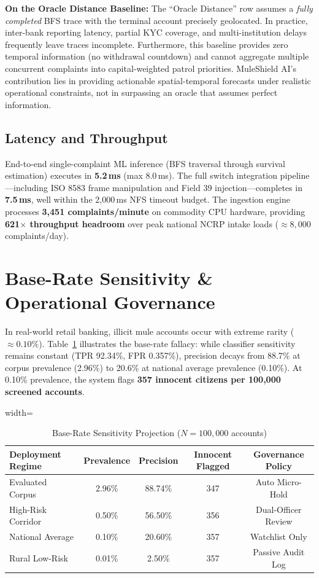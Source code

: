 \documentclass[conference]{IEEEtran}
\begin{document}
\textbf{On the Oracle Distance Baseline:} The ``Oracle Distance'' row assumes a \textit{fully completed} BFS trace with the terminal account precisely geolocated. In practice, inter-bank reporting latency, partial KYC coverage, and multi-institution delays frequently leave traces incomplete. Furthermore, this baseline provides zero temporal information (no withdrawal countdown) and cannot aggregate multiple concurrent complaints into capital-weighted patrol priorities. MuleShield AI's contribution lies in providing actionable spatial-temporal forecasts under realistic operational constraints, not in surpassing an oracle that assumes perfect information.

\subsection{Latency and Throughput}
End-to-end single-complaint ML inference (BFS traversal through survival estimation) executes in \textbf{5.2\,ms} (max 8.0\,ms). The full switch integration pipeline---including ISO 8583 frame manipulation and Field 39 injection---completes in \textbf{7.5\,ms}, well within the 2,000\,ms NFS timeout budget. The ingestion engine processes \textbf{3,451 complaints/minute} on commodity CPU hardware, providing \textbf{621$\times$ throughput headroom} over peak national NCRP intake loads ($\approx 8,000$ complaints/day).

\section{Base-Rate Sensitivity \& Operational Governance}
In real-world retail banking, illicit mule accounts occur with extreme rarity ($\approx 0.10\%$). Table~\ref{tab:baserate} illustrates the base-rate fallacy: while classifier sensitivity remains constant (TPR 92.34\%, FPR 0.357\%), precision decays from 88.7\% at corpus prevalence (2.96\%) to 20.6\% at national average prevalence (0.10\%). At 0.10\% prevalence, the system flags \textbf{357 innocent citizens per 100,000 screened accounts}.

\begin{table}[htbp]
\caption{Base-Rate Sensitivity Projection ($N=100,000$ accounts)}
\label{tab:baserate}
\centering
\begin{adjustbox}{width=\columnwidth}
\begin{tabular}{lcccc}
\toprule
\textbf{Deployment Regime} & \textbf{Prevalence} & \textbf{Precision} & \textbf{Innocent Flagged} & \textbf{Governance Policy} \\
\midrule
Evaluated Corpus & 2.96\% & 88.74\% & 347 & Auto Micro-Hold \\
High-Risk Corridor & 0.50\% & 56.50\% & 356 & Dual-Officer Review \\
National Average & 0.10\% & 20.60\% & 357 & Watchlist Only \\
Rural Low-Risk & 0.01\% & 2.50\% & 357 & Passive Audit Log \\
\bottomrule
\end{tabular}
\end{adjustbox}
\end{table}
\end{document}
